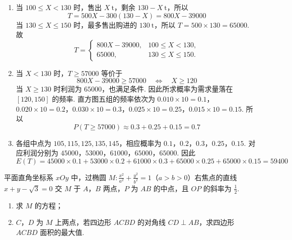 \begin{solution}
\begin{enumerate}
\item 当 \(100\leqslant X<130\) 时，售出 \(X\mathrm{~t}\)，剩余 \(130-X\mathrm{~t}\)，所以
\[
T=500X-300(130-X)=800X-39000
\]
当 \(130\leqslant X\leqslant150\) 时，最多售出购进的 \(130\mathrm{~t}\)，所以 \(T=500\times130=65000\). 故
\[
T=\begin{cases}
800X-39000,&100\leqslant X<130,\\
65000,&130\leqslant X\leqslant150.
\end{cases}
\]

\item 当 \(X<130\) 时，\(T\geqslant57000\) 等价于
\[
800X-39000\geqslant57000\quad\Longleftrightarrow\quad X\geqslant120
\]
当 \(X\geqslant130\) 时利润为 \(65000\)，也满足条件. 因此所求概率为需求量落在 \([120,150]\) 的频率.
直方图五组的频率依次为
\(0.010\times10=0.1\)，\(0.020\times10=0.2\)，\(0.030\times10=0.3\)，\(0.025\times10=0.25\)，\(0.015\times10=0.15\).
所以
\[
P(T\geqslant57000)\approx0.3+0.25+0.15=0.7
\]

\item 各组中点为 \(105,115,125,135,145\)，相应概率为 \(0.1\)，\(0.2\)，\(0.3\)，\(0.25\)，\(0.15\). 对应利润分别为
\(45000\)，\(53000\)，\(61000\)，\(65000\)，\(65000\).
因此
\[
E(T)=45000\times0.1+53000\times0.2+61000\times0.3
+65000\times0.25+65000\times0.15=59400
\]
\end{enumerate}
\end{solution}

\begin{problem}
平面直角坐标系 \(xOy\) 中，过椭圆 \(M: \frac{x^2}{a^2} + \frac{y^2}{b^2} = 1\)（\(a > b > 0\)）右焦点的直线 \(x + y - \sqrt{3} = 0\) 交 \(M\) 于 \(A\)，\(B\) 两点，\(P\) 为 \(AB\) 的中点，且 \(OP\) 的斜率为 \(\frac{1}{2}\).

\begin{enumerate}
\item 求 \(M\) 的方程；
\item \(C\)，\(D\) 为 \(M\) 上两点，若四边形 \(ACBD\) 的对角线 \(CD \perp AB\)，求四边形 \(ACBD\) 面积的最大值.
\end{enumerate}
\end{problem}

